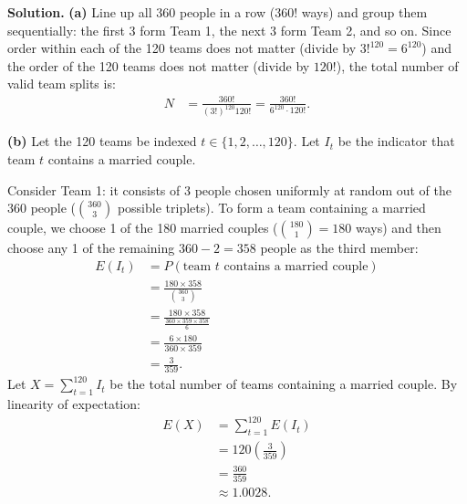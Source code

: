 \documentclass[11pt,a4paper]{article}
\begin{document}
\noindent \textbf{Solution.} \textbf{(a)} Line up all 360 people in a row ($360!$ ways) and group them sequentially: the first 3 form Team 1, the next 3 form Team 2, and so on. Since order within each of the 120 teams does not matter (divide by $3!^{120} = 6^{120}$) and the order of the 120 teams does not matter (divide by $120!$), the total number of valid team splits is:
\begin{align*}
N &= \frac{360!}{(3!)^{120} 120!} = \frac{360!}{6^{120} \cdot 120!}.
\end{align*}

\vspace{4pt}
\noindent \textbf{(b)} Let the 120 teams be indexed $t \in \{1, 2, \dots, 120\}$. Let $I_t$ be the indicator that team $t$ contains a married couple. 

Consider Team 1: it consists of 3 people chosen uniformly at random out of the 360 people ($\binom{360}{3}$ possible triplets). To form a team containing a married couple, we choose 1 of the 180 married couples ($\binom{180}{1} = 180$ ways) and then choose any 1 of the remaining $360 - 2 = 358$ people as the third member:
\begin{align*}
E(I_t) &= P(\text{team } t \text{ contains a married couple}) \\
&= \frac{180 \times 358}{\binom{360}{3}} \\
&= \frac{180 \times 358}{\frac{360 \times 359 \times 358}{6}} \\
&= \frac{6 \times 180}{360 \times 359} \\
&= \frac{3}{359}.
\end{align*}
Let $X = \sum_{t=1}^{120} I_t$ be the total number of teams containing a married couple. By linearity of expectation:
\begin{align*}
E(X) &= \sum_{t=1}^{120} E(I_t) \\
&= 120 \left(\frac{3}{359}\right) \\
&= \frac{360}{359} \\
&\approx 1.0028.
\end{align*}

\vspace{10pt}
\end{document}
